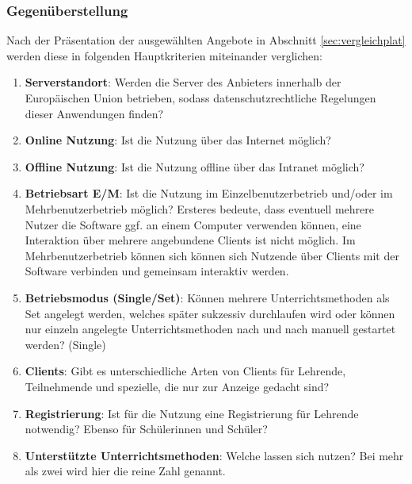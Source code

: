 \subsubsection{Gegenüberstellung}\label{sec:gegenstellung}
Nach der Präsentation der ausgewählten Angebote in Abschnitt \ref{sec:vergleichplat} werden diese in folgenden Hauptkriterien miteinander verglichen:
\begin{enumerate}
	\item \textbf{Serverstandort}: Werden die Server des Anbieters innerhalb der Europäischen Union betrieben, sodass datenschutzrechtliche Regelungen dieser Anwendungen finden?
	\item \textbf{Online Nutzung}: Ist die Nutzung über das Internet möglich? 
	\item \textbf{Offline Nutzung}: Ist die Nutzung offline über das Intranet möglich? 
	\item \textbf{Betriebsart E/M}: Ist die Nutzung im Einzelbenutzerbetrieb und/oder im Mehrbenutzerbetrieb möglich? Ersteres bedeute, dass eventuell mehrere Nutzer die Software ggf. an einem Computer verwenden können, eine Interaktion über mehrere angebundene Clients ist nicht möglich. Im Mehrbenutzerbetrieb können sich können sich Nutzende über Clients mit der Software verbinden und gemeinsam interaktiv werden.
	\item \textbf{Betriebsmodus (Single/Set)}: Können mehrere Unterrichtsmethoden als Set angelegt werden, welches später sukzessiv durchlaufen wird oder können nur einzeln angelegte Unterrichtsmethoden nach und nach manuell gestartet werden? (Single)
	\item \textbf{Clients}: Gibt es unterschiedliche  Arten von Clients für Lehrende, Teilnehmende und spezielle, die nur zur Anzeige gedacht sind?
	\item \textbf{Registrierung}: Ist für die Nutzung eine Registrierung für Lehrende notwendig? Ebenso für Schülerinnen und Schüler?
	\item \textbf{Unterstützte Unterrichtsmethoden}: Welche lassen sich nutzen? Bei mehr als zwei wird hier die reine Zahl genannt.  
\end{enumerate}

